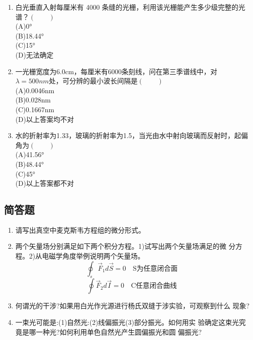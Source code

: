 \begin{enumerate}
(A)0.8mm\\
(B)8mm\\
(C)0.4mm\\
(D)4mm
\item 白光垂直入射每厘米有 4000 条缝的光栅，利用该光栅能产生多少级完整的光谱？$(\qquad)$\\
(A)0°\\
(B)18.44°\\
(C)15°\\
(D)无法确定
\item 一光栅宽度为6.0cm，每厘米有6000条刻线，问在第三季谱线中，对$\lambda=500nm$处，可分辨的最小波长间隔是$(\qquad)$\\
(A)0.0046nm\\
(B)0.028nm\\
(C)0.1667nm\\
(D)以上答案均不对
\item 水的折射率为1.33，玻璃的折射率为1.5，当光由水中射向玻璃而反射时，起偏角为$(\qquad)$\\
(A)41.56°\\
(B)48.44°\\
(C)45°\\
(D)以上答案都不对
\end{enumerate}
\subsection{简答题}
\begin{enumerate}
\item 请写出真空中麦克斯韦方程组的微分形式。
\item 两个矢量场分别满足如下两个积分方程。1)试写出两个矢量场满足的微
分方程。2)从电磁学角度举例说明两个矢量场。
\begin{equation}
\oint_s \vec F_1d\vec S=0 \quad \text{S为任意闭合面}~
\end{equation}
\begin{equation}
\oint \vec F_2d\vec I=0 \quad \text{C任意闭合曲线}~
\end{equation}
\item 何谓光的干涉?如果用白光作光源进行杨氏双缝于涉实验，可观察到什么
现象?
\item 一束光可能是:(1)自然光:(2)线偏振光(3)部分振光。如何用实
验确定这束光究竟是哪一种光?如何利用单色自然光产生圆偏振光和圆
偏振光?
\end{enumerate}
